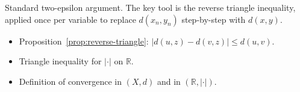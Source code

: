 \begin{remark*}
Standard two-epsilon argument. The key tool is the reverse triangle inequality,
applied once per variable to replace $d(x_n, y_n)$ step-by-step with $d(x, y)$.
\end{remark*}

\begin{remark*}[Dependencies]
\begin{itemize}
  \item Proposition~\ref{prop:reverse-triangle}: $|d(u,z) - d(v,z)| \le d(u,v)$.
  \item Triangle inequality for $|\cdot|$ on $\mathbb{R}$.
  \item Definition of convergence in $(X,d)$ and in $(\mathbb{R}, |\cdot|)$.
\end{itemize}
\end{remark*}
